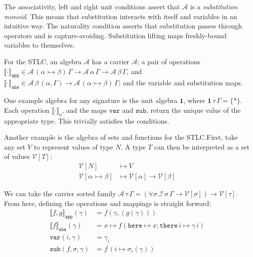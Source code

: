 \documentclass[11pt,a4paper]{article}
\newcommand*\tarr[2]{\ensuremath{{#1} \rightarrowtail {#2}}}
\newcommand*\ctxcons[2]{{#1}, {#2}}
\begin{document}
The associativity, left and right unit conditions assert that \(\mathcal{A}\) is a
\emph{substitution monoid}. This means that substitution interacts with itself
and variables in an intuitive way. The naturality condition asserts that
substitution passes through operators and is capture-avoiding. Substitution
lifting maps freshly-bound variables to themselves.

For the STLC, an algebra \(\mathcal{A}\) has a carrier \(\mathcal{A}\); a pair of operations
\({\llbracket\cdot\rrbracket}_\mathtt{app} \in {{\mathcal{A}\,(\tarr{\alpha}{\beta})\,\Gamma} \to {\mathcal{A}\,\alpha\,\Gamma} \to
{\mathcal{A}\,\beta\,\Gamma}}\), and \({\llbracket\cdot\rrbracket}_\mathtt{abs} \in
{{\mathcal{A}\,\beta\,(\ctxcons{\alpha}{\Gamma})} \to {\mathcal{A}\,(\tarr{\alpha}{\beta})\,\Gamma}}\); and the variable and
substitution maps.

One example algebra for any signature is the unit algebra \(\mathbf{1}\), where
\(\mathbf{1}\,\tau\,\Gamma = {\{\ast\}}\). Each operation \({\llbracket\cdot\rrbracket}_o\),
and the maps \(\mathtt{var}\) and \(\mathtt{sub}\), return the unique value of
the appropriate type. This trivially satisfies the conditions.

Another example is the algebra of sets and functions for the STLC.\@ First, take
any set \(V\) to represent values of type \(N\). A type \(T\) can then be
interpreted as a set of values \(\mathcal{V}[T]\):
\begin{align*}
{\mathcal{V}[N]} &\mapsto V \\
{\mathcal{V}[\alpha \rightarrowtail \beta]} &\mapsto {{\mathcal{V}[\alpha]} \to {\mathcal{V}[\beta]}}
\end{align*}

We can take the carrier sorted family \({\mathcal{A}\,\tau\,\Gamma} = {(\forall \sigma. {{\mathcal{I}\,\sigma\,\Gamma} \to
{\mathcal{V}[\sigma]}}) \to {\mathcal{V}[\tau]}}\). From here, defining the operations and mappings
is straight forward:
\begin{align*}
{{\llbracket {f , g} \rrbracket}_{\mathtt{app}}(\gamma)} &= {f(\gamma,(g(\gamma)))} \\
{{\llbracket {f} \rrbracket}_{\mathtt{abs}}(\gamma)} &=
  {x \mapsto {f({\mathtt{here} \mapsto x}; {{\mathtt{there}\,i} \mapsto \gamma\,i})}} \\
{\mathtt{var}(i, \gamma)} &= \gamma_i \\
{\mathtt{sub}(f,\sigma,\gamma)} &= {f\,(i \mapsto {\sigma_i(\gamma)})}
\end{align*}
\end{document}
